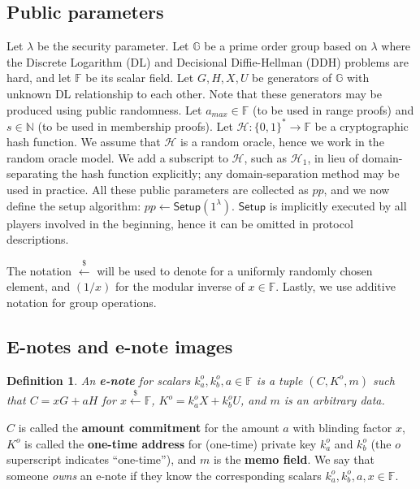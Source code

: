 \documentclass{article}
\theoremstyle{plain}
\newtheorem{definition}{Definition}[section]
\theoremstyle{remark}
\begin{document}
\subsection{Public parameters}
Let $\lambda$ be the security parameter. Let $\mathbb{G}$ be a prime order group based on $\lambda$ where the Discrete Logarithm (DL) and Decisional Diffie-Hellman (DDH) problems are hard, and let $\mathbb{F}$ be its scalar field. Let $G, H, X, U$ be generators of $\mathbb{G}$ with unknown DL relationship to each other. Note that these generators may be produced using public randomness. Let $a_{max}\in\mathbb{F}$ (to be used in range proofs) and $s\in\mathbb{N}$ (to be used in membership proofs). Let $\mathcal{H}:\{0,1\}^*\rightarrow\mathbb{F}$ be a cryptographic hash function. We assume that $\mathcal{H}$ is a random oracle, hence we work in the random oracle model. We add a subscript to $\mathcal{H}$, such as $\mathcal{H}_1$, in lieu of domain-separating the hash function explicitly; any domain-separation method may be used in practice. All these public parameters are collected as $pp$, and we now define the setup algorithm: $pp\leftarrow\textsf{Setup}(1^{\lambda})$. $\textsf{Setup}$ is implicitly executed by all players involved in the beginning, hence it can be omitted in protocol descriptions.

The notation $\xleftarrow{\$}$ will be used to denote for a uniformly randomly chosen element, and $(1/x)$ for the modular inverse of $x\in\mathbb{F}$. Lastly, we use additive notation for group operations.

\subsection{E-notes and e-note images}
\begin{definition}\label{e-note}
An \textbf{\em e-note} for scalars $k_a^o, k_b^o, a \in\mathbb{F}$ is a tuple $(C, K^o, m)$ such that $C = x G + a H$ for $x\xleftarrow{\$}\mathbb{F}$, $K^o=k_a^o X + k_b^o U$, and $m$ is an arbitrary data.
\end{definition}
$C$ is called the \textbf{amount commitment} for the amount $a$ with blinding factor $x$, $K^o$ is called the \textbf{one-time address} for (one-time) private key $k_a^o$ and $k_b^o$ (the $o$ superscript indicates ``one-time''), and $m$ is the \textbf{memo field}. We say that someone \textit{owns} an e-note if they know the corresponding scalars $k_a^o, k_b^o, a, x \in\mathbb{F}$.
\end{document}
